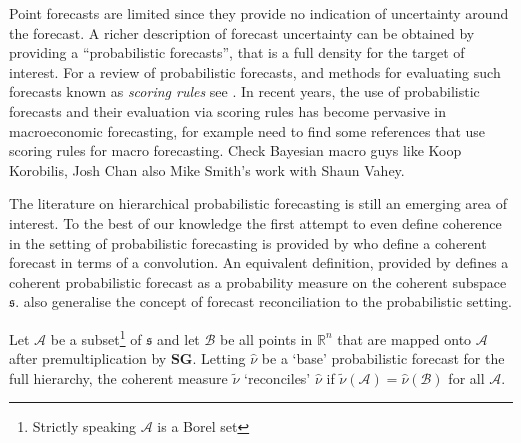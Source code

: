 \documentclass[graybox]{svmult}
\begin{document}
Point forecasts are limited since they provide no indication of uncertainty around the forecast. A richer description of forecast uncertainty can be obtained by providing a ``probabilistic forecasts'', that is a full density for the target of interest. For a review of probabilistic forecasts, and methods for evaluating such forecasts known as {\em scoring rules} see  \citep{Gneiting2014}. In recent years, the use of probabilistic forecasts and their evaluation via scoring rules has become pervasive in macroeconomic forecasting, for example {\color{red} need to find some references that use scoring rules for macro forecasting.  Check Bayesian macro guys like Koop Korobilis, Josh Chan also Mike Smith's work with Shaun Vahey}.


The literature on hierarchical probabilistic forecasting is still an emerging area of interest. %
To the best of our knowledge the first attempt to even define coherence in the setting of probabilistic forecasting is provided by \cite{Taieb2017} who define a coherent forecast in terms of a convolution.  An equivalent definition, provided by \cite{Gamakumara2018} defines a  coherent probabilistic forecast as a probability measure on the coherent subspace $\mathfrak{s}$.  \cite{Gamakumara2018} also generalise the concept of forecast reconciliation to the probabilistic setting.

\begin{definition} Let $\mathcal{A}$ be a subset\footnote{Strictly speaking $\mathcal{A}$ is a Borel set} of $\mathfrak{s}$ and let $\mathcal{B}$ be all points in $\mathbb{R}^n$ that are mapped onto  $\mathcal{A}$ after premultiplication by $\bm{S}\bm{G}$. Letting $\hat{\nu}$ be a `base' probabilistic forecast for the full hierarchy, the coherent measure $\tilde{\nu}$ `reconciles' $\hat{\nu}$ if $\tilde{\nu}(\mathcal{A})=\hat{\nu}(\mathcal{B})$ for all $\mathcal{A}$.
\end{definition}
\end{document}
